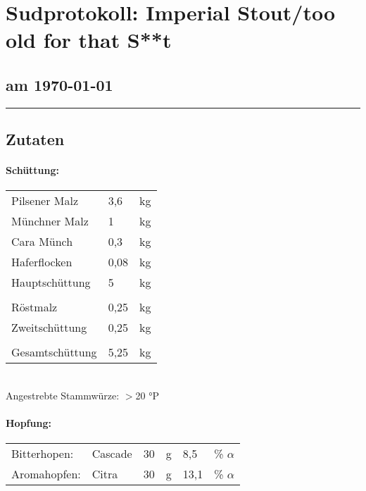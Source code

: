 \documentclass[12pt,oneside,a4paper]{scrartcl}
\begin{document}
	\begin{minipage}[c]{0.70\textwidth}
		\section*{\hspace{-.4cm}Sudprotokoll: Imperial Stout/{\large too old for that S**t} }
	\end{minipage}
	\begin{minipage}[c]{0.29\textwidth}
		\subsection*{am \today}
	\end{minipage}
	\rule{\textwidth}{1pt}
%
\subsection*{Zutaten}
%
\paragraph{Schüttung:}
	\begin{tabular}[t]{m{8cm} m{2cm} m{1cm}}
		Pilsener Malz & 3,6 & kg \bigstrut\\
		Münchner Malz & 1 & kg \bigstrut\\
		Cara Münch & 0,3 & kg \bigstrut\\
		Haferflocken & 0,08 & kg \bigstrut\\ \hline
		Hauptschüttung & 5 & kg \bigstrut\\
		&&\\
		Röstmalz & 0,25 & kg \bigstrut\\\hline
		Zweitschüttung & 0,25 & kg \bigstrut\\
		&&\\\hline\hline
		Gesamtschüttung & 5,25 & kg\bigstrut
	\end{tabular}\\

\vspace{.25cm}
\hspace{1cm}Angestrebte Stammwürze: $>$20 °P
%
\paragraph{Hopfung:}
	\begin{tabular}[t]{m{2.5cm} m{5cm} m{0.5cm} m{1cm} m{0.5cm} m{1cm}}
		Bitterhopen: & Cascade & 30 & g & 8,5 & \% $\alpha$ \\
		Aromahopfen: & Citra & 30 & g & 13,1 &  \% $\alpha$
	\end{tabular}\\
\end{document}
